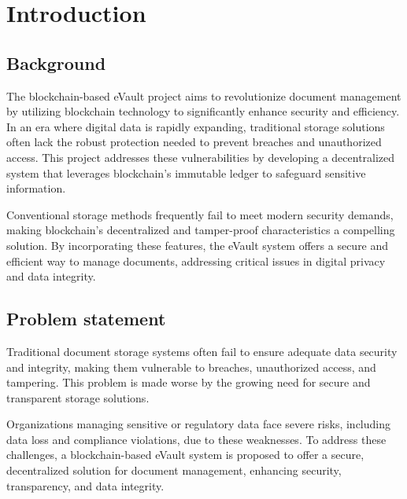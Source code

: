 \documentclass[12pt,a4paper]{report}
\begin{document}

\pagestyle{fancy}
\fancyhf{}
\renewcommand{\headrulewidth}{0.5pt}
\renewcommand{\footrulewidth}{0.5pt}




\chapter{Introduction}

\section{Background}

The blockchain-based eVault project aims to revolutionize document 
management by utilizing blockchain technology to significantly 
enhance security and efficiency. In an era where digital data is 
rapidly expanding, traditional storage solutions often lack the 
robust protection needed to prevent breaches and unauthorized 
access. This project addresses these vulnerabilities by developing 
a decentralized system that leverages blockchain’s immutable 
ledger to safeguard sensitive information.

Conventional storage methods frequently fail to meet modern 
security demands, making blockchain’s decentralized and 
tamper-proof characteristics a compelling solution. By 
incorporating these features, the eVault system offers a 
secure and efficient way to manage documents, addressing 
critical issues in digital privacy and data integrity.


\section{Problem statement }
Traditional document storage systems often fail to ensure 
adequate data security and integrity, making them vulnerable 
to breaches, unauthorized access, and tampering. This problem 
is made worse by the growing need for secure and transparent 
storage solutions.

Organizations managing sensitive or regulatory data face severe 
risks, including data loss and compliance violations, due to 
these weaknesses. To address these challenges, a blockchain-based 
eVault system is proposed to offer a secure, decentralized 
solution for document management, enhancing security, transparency, 
and data integrity.
\newpage
\end{document}
